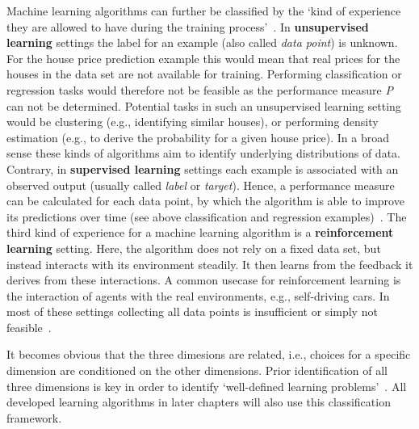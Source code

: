 Machine learning algorithms can further be classified by the `kind of experience
they are allowed to have during the training process'~\cite[p. 104]{Goodfellow2016}.
In \textbf{unsupervised learning} settings the label for an example (also called
\textit{data point}) is unknown. For the house price prediction example this
would mean that real prices for the houses in the data set are not
available for training. Performing classification or regression tasks would
therefore not be feasible as the performance measure \textit{P} can not be
determined. Potential tasks in such an unsupervised learning setting would be
clustering (e.g., identifying similar houses), or performing density estimation
(e.g., to derive the probability for a given house price). In a broad sense these
kinds of algorithms aim to identify underlying distributions of data. Contrary, in 
\textbf{supervised learning} settings each example is associated with an 
observed output (usually called \textit{label} or \textit{target}). Hence, a
performance measure can be calculated for each data point, by which the
algorithm is able to improve its predictions over time (see above classification
and regression examples)~\cite{Goodfellow2016, Bishop2006}. The third kind of
experience for a machine learning algorithm is a \textbf{reinforcement learning}
setting. Here, the algorithm does not rely on a fixed data set, but instead 
interacts with its environment steadily. It then learns from the feedback it
derives from these interactions. A common usecase for reinforcement
learning is the interaction of agents with the real environments, e.g.,
self-driving cars. In most of these settings collecting all data points is
insufficient or simply not feasible~\cite{Sutton1998}.

It becomes obvious that the three dimesions are related, i.e., choices for a
specific dimension are conditioned on the other dimensions. Prior identification 
of all three dimensions is key in order to identify 
`well-defined learning problems'~\cite[p. 2f.]{Mitchell1997}. All developed 
learning algorithms in later chapters will also use this classification 
framework. 

